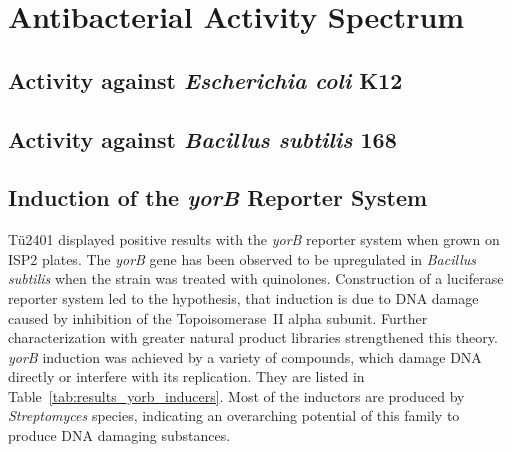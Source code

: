 


\section{Antibacterial Activity Spectrum} %
\label{sec:antibacterial_activity_spectrum}


\subsection{Activity against \textit{Escherichia coli} K12} %
\label{sub:activity_against_e_coli}


\subsection{Activity against \textit{Bacillus subtilis} 168} %
\label{sub:activity_against_b_subtilis}


\subsection{Induction of the \textit{yorB} Reporter System} %
\label{sub:induction_of_the_yorb_reporter_system}

Tü2401 displayed positive results with the \textit{yorB} reporter system when grown on ISP2 plates.
The \textit{yorB} gene has been observed to be upregulated in \textit{Bacillus subtilis} when the strain was treated with quinolones.\autocite{Hutter2004a}
Construction of a luciferase reporter system led to the hypothesis, that induction is due to DNA damage caused by inhibition of the Topoisomerase~II alpha subunit.\autocite{Hutter2004}
Further characterization with greater natural product libraries strengthened this theory.\autocite{Mariner2011,Urban2007}
\textit{yorB} induction was achieved by a variety of compounds, which damage DNA directly or interfere with its replication.
They are listed in Table~\ref{tab:results_yorb_inducers}.
Most of the inductors are produced by \textit{Streptomyces} species, indicating an overarching potential of this family to produce DNA damaging substances.

